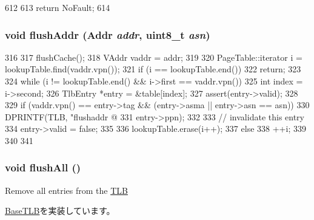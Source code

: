 \begin{DoxyCode}
612 {
613     return NoFault;
614 }
\end{DoxyCode}
\hypertarget{classAlphaISA_1_1TLB_acac93fcf5aeb0db9145137bd198cb417}{
\subsubsection[{flushAddr}]{\setlength{\rightskip}{0pt plus 5cm}void flushAddr ({\bf Addr} {\em addr}, \/  uint8\_\-t {\em asn})}}
\label{classAlphaISA_1_1TLB_acac93fcf5aeb0db9145137bd198cb417}



\begin{DoxyCode}
316 {
317     flushCache();
318     VAddr vaddr = addr;
319 
320     PageTable::iterator i = lookupTable.find(vaddr.vpn());
321     if (i == lookupTable.end())
322         return;
323 
324     while (i != lookupTable.end() && i->first == vaddr.vpn()) {
325         int index = i->second;
326         TlbEntry *entry = &table[index];
327         assert(entry->valid);
328 
329         if (vaddr.vpn() == entry->tag && (entry->asma || entry->asn == asn)) {
330             DPRINTF(TLB, "flushaddr @%
331                     entry->ppn);
332 
333             // invalidate this entry
334             entry->valid = false;
335 
336             lookupTable.erase(i++);
337         } else {
338             ++i;
339         }
340     }
341 }
\end{DoxyCode}
\hypertarget{classAlphaISA_1_1TLB_aca1483a67aee5a91e442f7131d66bcbd}{
\subsubsection[{flushAll}]{\setlength{\rightskip}{0pt plus 5cm}void flushAll ()}}
\label{classAlphaISA_1_1TLB_aca1483a67aee5a91e442f7131d66bcbd}
Remove all entries from the \hyperlink{classAlphaISA_1_1TLB}{TLB} 

\hyperlink{classBaseTLB_a5958bc92949a47d1be1088468abdc006}{BaseTLB}を実装しています。



